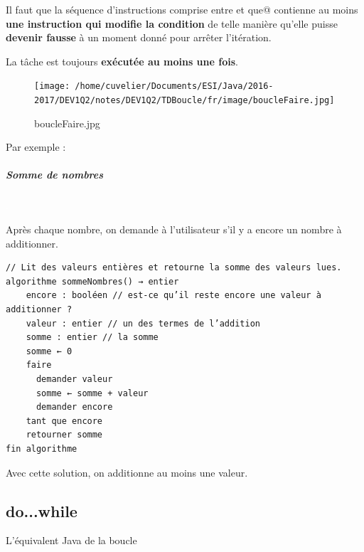 \documentclass[11pt,a4paper]{article}
\begin{document}
            \par
        
        Il faut que la s\'equence d'instructions comprise entre \verb@faire@ 
        et \verb@tant que@ contienne au moins 
        \textbf{une instruction qui modifie la condition} de telle mani\`ere 
        qu'elle puisse \textbf{devenir fausse} \`a un moment donn\'e pour arr\^eter l'it\'eration.
      
            \par
        
        La t\^ache est toujours \textbf{ex\'ecut\'ee au moins une fois}.
      
            \par
        \begin{figure}[hbt]
				    \begin{center}
					\texttt{[image: /home/cuvelier/Documents/ESI/Java/2016-2017/DEV1Q2/notes/DEV1Q2/TDBoucle/fr/image/boucleFaire.jpg]}
						\end{center}
                
                    \caption[boucleFaire.jpg]{boucleFaire.jpg}
                \end{figure}
                    
            \par
        Par exemple : 
            \par
        
			
		\subparagraph{Somme de nombres} 
		
					\textcolor{white}{.} \par
				 Apr\`es chaque nombre, on demande \`a l'utilisateur s'il y a encore un nombre \`a additionner.
            \par
        \begin{verbatim}
// Lit des valeurs entières et retourne la somme des valeurs lues.
algorithme sommeNombres() → entier
    encore : booléen // est-ce qu’il reste encore une valeur à additionner ?
    valeur : entier // un des termes de l’addition
    somme : entier // la somme
    somme ← 0
    faire
      demander valeur
      somme ← somme + valeur
      demander encore
    tant que encore
    retourner somme
fin algorithme
      \end{verbatim}Avec cette solution, on additionne au moins une valeur.
            \par
        \subsection{do...while}
		    L'\'equivalent Java de la boucle 
		  
\end{document}
